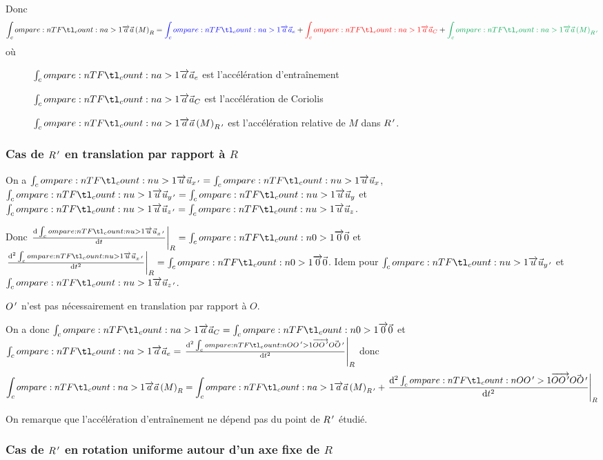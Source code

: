 Donc \[\v{a}\paren{M}_R=\textcolor{blue}{\v{a}_e}+\textcolor{red}{\v{a}_C}+\textcolor{Green}{\v{a}\paren{M}_{R\prim}}\] où \begin{description}
    \item[] \(\v{a}_e\) est l'accélération d'entraînement \\
    \item[] \(\v{a}_C\) est l'accélération de Coriolis \\
    \item[] \(\v{a}\paren{M}_{R\prim}\) est l'accélération relative de \(M\) dans \(R^{\,\prime}\).
\end{description}

\subsubsection{Cas de \(R^{\,\prime}\) en translation par rapport à \(R\)}

On a \(\v{u}_{x\prim}=\v{u}_x\), \(\v{u}_{y\prim}=\v{u}_y\) et \(\v{u}_{z\prim}=\v{u}_z\).

Donc \(\odv{\v{u}_{x\prim}}{t}_R=\v{0}\) et \(\odv[order=2]{\v{u}_{x\prim}}{t}_R=\v{0}\). Idem pour \(\v{u}_{y\prim}\) et \(\v{u}_{z\prim}\).

\attention \(O^{\,\prime}\) n'est pas nécessairement en translation par rapport à \(O\).

On a donc \(\v{a}_C=\v{0}\) et \(\v{a}_e=\odv[order=2]{\v{OO\prim}}{t}_R\) donc \[\v{a}\paren{M}_R=\v{a}\paren{M}_{R\prim}+\odv[order=2]{\v{OO\prim}}{t}_R\]

On remarque que l'accélération d'entraînement ne dépend pas du point de \(R^{\,\prime}\) étudié.

\subsubsection{Cas de \(R^{\,\prime}\) en rotation uniforme autour d'un axe fixe de \(R\)}

\begin{center}
\end{center}

